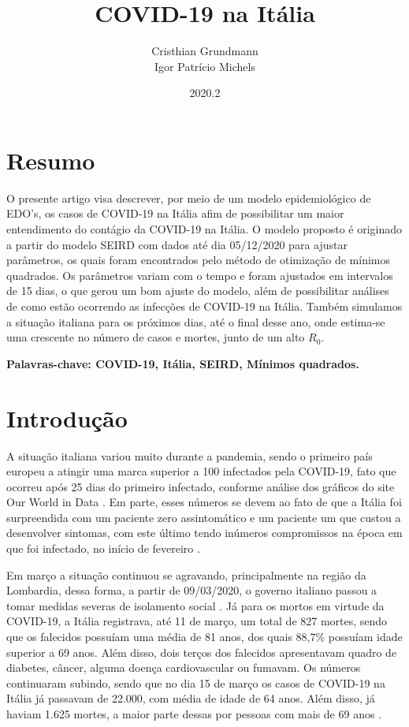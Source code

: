 \documentclass{article}
\title{COVID-19 na Itália}
\author{Cristhian Grundmann \\
Igor Patrício Michels}
\date{2020.2}
\begin{document}
\maketitle

\section*{Resumo}

O presente artigo visa descrever, por meio de um modelo epidemiológico de EDO's, os casos de COVID-19 na Itália afim de possibilitar um maior entendimento do contágio da COVID-19 na Itália. O modelo proposto é originado a partir do modelo SEIRD com dados até dia 05/12/2020 para ajustar parâmetros, os quais foram encontrados pelo método de otimização de mínimos quadrados. Os parâmetros variam com o tempo e foram ajustados em intervalos de 15 dias, o que gerou um bom ajuste do modelo, além de possibilitar análises de como estão ocorrendo as infecções de COVID-19 na Itália. Também simulamos a situação italiana para os próximos dias, até o final desse ano, onde estima-se uma crescente no número de casos e mortes, junto de um alto $R_0$.

\noindent \textbf{Palavras-chave: COVID-19, Itália, SEIRD, Mínimos quadrados.}

\section{Introdução}

A situação italiana variou muito durante a pandemia, sendo o primeiro país europeu a atingir uma marca superior a 100 infectados pela COVID-19, fato que ocorreu após 25 dias do primeiro infectado, conforme análise dos gráficos do site Our World in Data \cite{owid}. Em parte, esses números se devem ao fato de que a Itália foi surpreendida com um paciente zero assintomático e um paciente um que custou a desenvolver sintomas, com este último tendo inúmeros compromissos na época em que foi infectado, no início de fevereiro \cite{dn}\cite{cm}.

Em março a situação continuou se agravando, principalmente na região da Lombardia, dessa forma, a partir de 09/03/2020, o governo italiano passou a tomar medidas severas de isolamento social \cite{piccolomini}. Já para os mortos em virtude da COVID-19, a Itália registrava, até 11 de março, um total de 827 mortes, sendo que os falecidos possuíam uma média de 81 anos, dos quais 88,7\% possuíam idade superior a 69 anos. Além disso, dois terços dos falecidos apresentavam quadro de diabetes, câncer, alguma doença cardiovascular ou fumavam. Os números continuaram subindo, sendo que no dia 15 de março os casos de COVID-19 na Itália já passavam de 22.000, com média de idade de 64 anos. Além disso, já haviam 1.625 mortes, a maior parte dessas por pessoas com mais de 69 anos \cite{REMUZZI20201225}\cite{10.1001/jama.2020.4344}.
\end{document}
